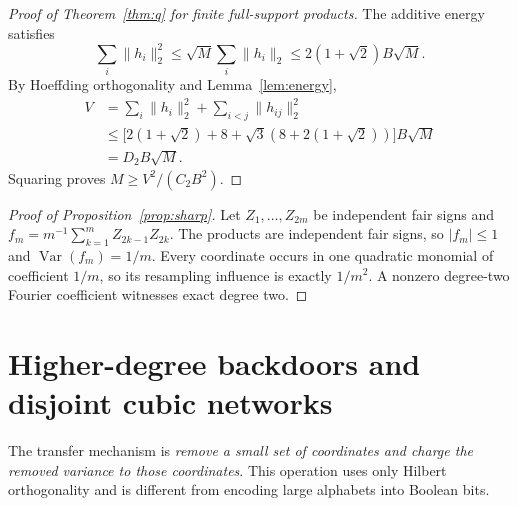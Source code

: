 \documentclass[11pt,letterpaper]{article}
\theoremstyle{definition}
\newcommand{\Var}{\operatorname{Var}}
\newcommand{\Ctwo}{C_2}
\newcommand{\abs}[1]{\lvert #1\rvert}
\newcommand{\norm}[1]{\lVert #1\rVert}
\begin{document}
\begin{proof}[Proof of Theorem~\ref{thm:q} for finite full-support products]
The additive energy satisfies
\[\sum_i\norm{h_i}_2^2\le\sqrt M\sum_i\norm{h_i}_2\le2(1+\sqrt2)B\sqrt M.\]
By Hoeffding orthogonality and Lemma~\ref{lem:energy},
\[
\begin{aligned}
V&=\sum_i\norm{h_i}_2^2+\sum_{i<j}\norm{h_{ij}}_2^2\\
&\le\bigl[2(1+\sqrt2)+8+\sqrt3(8+2(1+\sqrt2))\bigr]B\sqrt M\\
&=D_2B\sqrt M.
\end{aligned}
\]
Squaring proves $M\ge V^2/(\Ctwo B^2)$.
\end{proof}

\begin{proof}[Proof of Proposition~\ref{prop:sharp}]
Let $Z_1,\ldots,Z_{2m}$ be independent fair signs and $f_m=m^{-1}\sum_{k=1}^m Z_{2k-1}Z_{2k}$. The products are independent fair signs, so $\abs{f_m}\le1$ and $\Var(f_m)=1/m$. Every coordinate occurs in one quadratic monomial of coefficient $1/m$, so its resampling influence is exactly $1/m^2$. A nonzero degree-two Fourier coefficient witnesses exact degree two.
\end{proof}


\section{Higher-degree backdoors and disjoint cubic networks}\label{sec:backdoors}
The transfer mechanism is \emph{remove a small set of coordinates and
charge the removed variance to those coordinates}. This operation
uses only Hilbert orthogonality and is different from encoding large
alphabets into Boolean bits.
\end{document}
